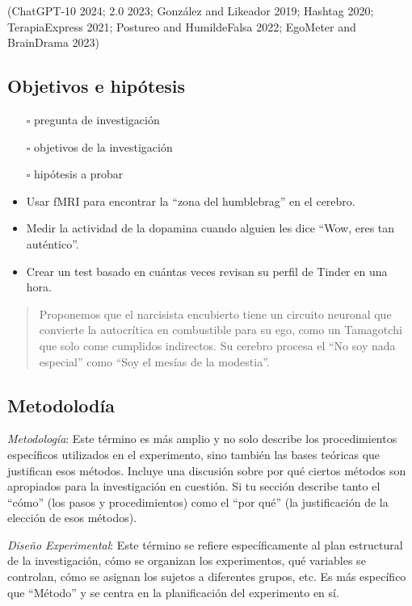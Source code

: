 \documentclass[
]{article}
\begin{document}
(ChatGPT-10 2024; 2.0 2023; González and Likeador 2019; Hashtag 2020;
TerapiaExpress 2021; Postureo and HumildeFalsa 2022; EgoMeter and
BrainDrama 2023)

\subsection{Objetivos e hipótesis}\label{objetivos-e-hipuxf3tesis}

\begin{itemize}
\item[$\square$]
  pregunta de investigación
\item[$\square$]
  objetivos de la investigación
\item[$\square$]
  hipótesis a probar
\item
  Usar fMRI para encontrar la ``zona del humblebrag'' en el cerebro.
\item
  Medir la actividad de la dopamina cuando alguien les dice ``Wow, eres
  tan auténtico''.
\item
  Crear un test basado en cuántas veces revisan su perfil de Tinder en
  una hora.
\end{itemize}

\begin{quote}
Proponemos que el narcisista encubierto tiene un circuito neuronal que
convierte la autocrítica en combustible para su ego, como un Tamagotchi
que solo come cumplidos indirectos. Su cerebro procesa el ``No soy nada
especial'' como ``Soy el mesías de la modestia''.
\end{quote}

\subsection{Metodolodía}\label{metodoloduxeda}

\emph{Metodología}: Este término es más amplio y no solo describe los
procedimientos específicos utilizados en el experimento, sino también
las bases teóricas que justifican esos métodos. Incluye una discusión
sobre por qué ciertos métodos son apropiados para la investigación en
cuestión. Si tu sección describe tanto el ``cómo'' (los pasos y
procedimientos) como el ``por qué'' (la justificación de la elección de
esos métodos).

\emph{Diseño Experimental}: Este término se refiere específicamente al
plan estructural de la investigación, cómo se organizan los
experimentos, qué variables se controlan, cómo se asignan los sujetos a
diferentes grupos, etc. Es más específico que ``Método'' y se centra en
la planificación del experimento en sí.
\end{document}
